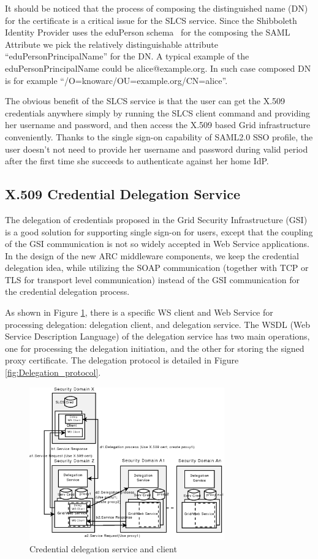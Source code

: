 \documentclass[twocolumn]{svjour3}         %
\begin{document}
It should be noticed that the process of composing the distinguished name (DN) for the certificate is a critical issue for the SLCS service. Since the Shibboleth Identity Provider uses the eduPerson schema~\cite{eduSchemalink} for the composing the SAML Attribute we pick the relatively distinguishable attribute “eduPersonPrincipalName” for the DN. A typical example of the eduPersonPrincipalName  could be alice@example.org. In such case composed DN is for example “/O=knowarc/OU=example.org/CN=alice”.

The obvious benefit of the SLCS service is that the user can get the X.509 credentials anywhere simply by running the SLCS client command and providing her username and password, and then access the X.509 based Grid infrastructure conveniently. Thanks to the single sign-on capability of SAML2.0 SSO profile, the user doesn’t not need to provide her username and password during valid period after the first time she succeeds to authenticate against her home IdP.


\subsection{X.509 Credential Delegation Service}
\label{sec:creddeleg}
The delegation of credentials proposed in the Grid Security Infrastructure (GSI) is a good solution for supporting single sign-on for users, except that the coupling of the GSI communication is not so widely accepted in Web Service applications. In the design of the new ARC middleware components, we keep the credential delegation idea, while utilizing the SOAP communication (together with TCP or TLS for transport level communication) instead of the GSI communication for the credential delegation process.

As shown in Figure \ref{fig:Delegation}, there is a specific WS client and Web Service for processing delegation: delegation client, and delegation service. The WSDL (Web Service Description Language) of the delegation service has two main operations, one for processing the delegation initiation, and the other for storing the signed proxy certificate. The delegation protocol is detailed in Figure \ref{fig:Delegation_protocol}.

\begin{figure}
\includegraphics[width=0.75\textwidth]{Delegation.png}
\caption{Credential delegation service and client}
\label{fig:Delegation}
\end{figure}
\end{document}
